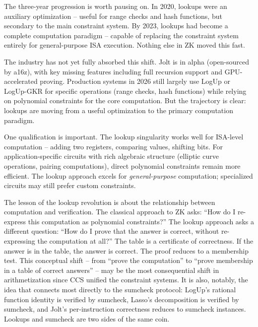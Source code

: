 \documentclass[
  11pt,
  openany]{report}
\begin{document}
The three-year progression is worth pausing on. In 2020, lookups were an
auxiliary optimization -- useful for range checks and hash functions, but
secondary to the main constraint system. By 2023, lookups had become a complete
computation paradigm -- capable of replacing the constraint system entirely for
general-purpose ISA execution. Nothing else in ZK moved this fast.

The industry has not yet fully absorbed this shift. Jolt is in alpha
(open-sourced by a16z), with key missing features including full recursion
support and GPU-accelerated proving. Production systems in 2026 still largely
use LogUp or LogUp-GKR for specific operations (range checks, hash functions)
while relying on polynomial constraints for the core computation. But the
trajectory is clear: lookups are moving from a useful optimization to the
primary computation paradigm.

One qualification is important. The lookup singularity works well for ISA-level
computation -- adding two registers, comparing values, shifting bits. For
application-specific circuits with rich algebraic structure (elliptic curve
operations, pairing computations), direct polynomial constraints remain more
efficient. The lookup approach excels for \emph{general-purpose} computation;
specialized circuits may still prefer custom constraints.

The lesson of the lookup revolution is about the relationship between
computation and verification. The classical approach to ZK asks: ``How do I
re-express this computation as polynomial constraints?'' The lookup approach
asks a different question: ``How do I prove that the answer is correct, without
re-expressing the computation at all?'' The table is a certificate of
correctness. If the answer is in the table, the answer is correct. The proof
reduces to a membership test. This conceptual shift -- from ``prove the
computation'' to ``prove membership in a table of correct answers'' -- may be
the most consequential shift in arithmetization since CCS unified the constraint
systems. It is also, notably, the idea that connects most directly to the
sumcheck protocol: LogUp's rational function identity is verified by sumcheck,
Lasso's decomposition is verified by sumcheck, and Jolt's per-instruction
correctness reduces to sumcheck instances. Lookups and sumcheck are two sides of
the same coin.
\end{document}
